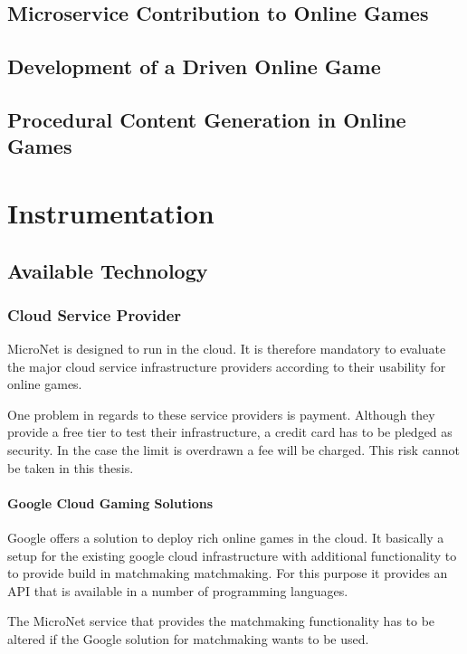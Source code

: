 \subsection{Microservice Contribution to Online Games}
\subsection{Development of a \ms{} Driven Online Game}
\subsection{Procedural Content Generation in Online Games}

\section{Instrumentation}
\subsection{Available Technology}

\subsubsection{Cloud Service Provider}

MicroNet is designed to run in the cloud. It is therefore mandatory to evaluate
the major cloud service infrastructure providers according to their usability
for online games.

One problem in regards to these service providers is payment. Although they
provide a free tier to test their infrastructure, a credit card has to be
pledged as security. In the case the limit is overdrawn a fee will be charged.
This risk cannot be taken in this thesis. 

\paragraph{Google Cloud Gaming Solutions}

Google offers a solution to deploy rich online games in the cloud. It basically
a setup for the existing google cloud infrastructure with additional
functionality to to provide build in matchmaking matchmaking. For this purpose
it provides an API that is available in a number of programming languages.

The MicroNet service that provides the matchmaking functionality has to be
altered if the Google solution for matchmaking wants to be used. 

